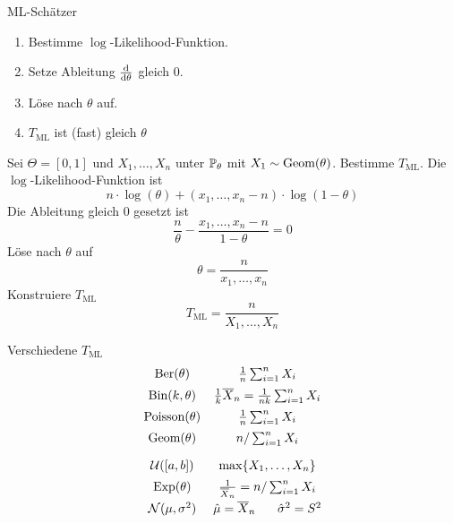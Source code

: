 \begin{recipe}{ML-Schätzer}
	\begin{enumerate}
		\item Bestimme $\log$-Likelihood-Funktion.
		\item Setze Ableitung $\dv{\theta}$ gleich $0$.
		\item Löse nach $\theta$ auf.
		\item $T_{\text{ML}}$ ist (fast) gleich $\theta$
	\end{enumerate}
\end{recipe}
\begin{example}
	Sei $\Theta = [0,1]$ und $X_{1}, \ldots, X_{n}$ unter $\mathbb{P}_\theta$ \iid mit $X_1 \sim \text{Geom} (\theta)$. Bestimme
	$T_{\text{ML}}$.
	\tcblower
	Die $\log$-Likelihood-Funktion ist
	\begin{equation*}
		n \cdot \log (\theta) + (x_{1}, \ldots, x_{n} - n) \cdot \log(1 - \theta)
	\end{equation*}
	Die Ableitung gleich $0$ gesetzt ist
	\begin{equation*}
		\frac{n}{\theta} - \frac{x_{1}, \ldots, x_{n} -n}{1 - \theta} = 0
	\end{equation*}
	Löse nach $\theta$ auf
	\begin{equation*}
		\theta = \frac{n}{x_{1}, \ldots, x_{n}} 
	\end{equation*}
	Konstruiere $T_{\text{ML}}$
	\begin{equation*}
		T_{\text{ML}} = \frac{n}{X_{1}, \ldots, X_{n}} 
	\end{equation*}
\end{example}

Verschiedene $T_{\text{ML}}$
\begin{equation*}
	\begin{array}{cc}
		\bern (\theta) & \frac{1}{n} \sum_{i=1}^{n} X_i\\[5pt]
		\bin (k,\theta) & \frac{1}{k} \overline{X}_n = \frac{1}{nk} \sum_{i=1}^{n} X_i\\[5pt]
		\pois (\theta) & \frac{1}{n} \sum_{i=1}^{n} X_i\\[5pt]
		\geom(\theta) & n / \sum_{i=1}^{n} X_i \\[10pt]
		\unif([a,b]) & \max\{X_1, \ldots , X_n\}\\[5pt]
		\expd(\theta) & \frac{1}{\overline{X}_n} = n / \sum_{i=1}^{n} X_i \\[5pt]
		\normd(\mu, \sigma^2) & \hat{\mu} = \overline{X}_n \hspace{5mm} \hat{\sigma}^2 = S^2
	\end{array}
\end{equation*}

